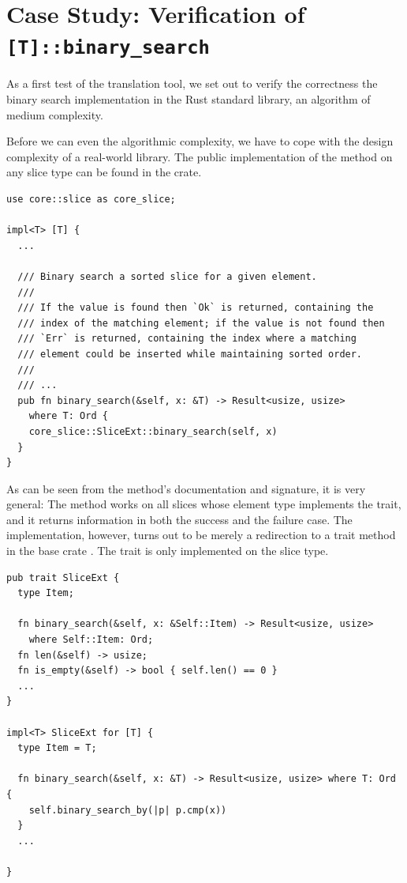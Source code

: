 \section{Case Study: Verification of \texttt{[T]::binary\_search}}
\label{sec:binary_search}

As a first test of the translation tool, we set out to verify the correctness
the binary search implementation in the Rust standard library, an algorithm of
medium complexity.

Before we can even the algorithmic complexity, we have to cope with the
design complexity of a real-world library. The public implementation of the
method on any slice type can be found in the  crate.

\begin{verbatim}
use core::slice as core_slice;

impl<T> [T] {
  ...

  /// Binary search a sorted slice for a given element.
  ///
  /// If the value is found then `Ok` is returned, containing the
  /// index of the matching element; if the value is not found then
  /// `Err` is returned, containing the index where a matching
  /// element could be inserted while maintaining sorted order.
  ///
  /// ...
  pub fn binary_search(&self, x: &T) -> Result<usize, usize>
    where T: Ord {
    core_slice::SliceExt::binary_search(self, x)
  }
}
\end{verbatim}

As can be seen from the method's documentation and signature, it
is very general: The method works on all slices whose element type implements the
 trait, and it returns information in both the success and the failure
case. The implementation, however, turns out to be merely a redirection to a
trait method in the base crate . The trait is only implemented
on the slice type.

\begin{verbatim}
pub trait SliceExt {
  type Item;

  fn binary_search(&self, x: &Self::Item) -> Result<usize, usize>
    where Self::Item: Ord;
  fn len(&self) -> usize;
  fn is_empty(&self) -> bool { self.len() == 0 }
  ...
}

impl<T> SliceExt for [T] {
  type Item = T;

  fn binary_search(&self, x: &T) -> Result<usize, usize> where T: Ord {
    self.binary_search_by(|p| p.cmp(x))
  }
  ...

}
\end{verbatim}

